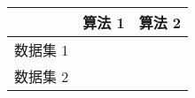 
\begin{tabular}{c|c|c}
\hline
      & 算法 1 & 算法 2 \\ \hline
数据集 1 &      &      \\ \hline
数据集 2 &      &      \\ \hline
\end{tabular}
